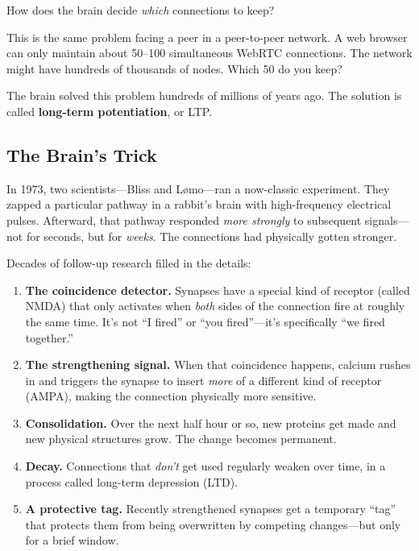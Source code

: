 \documentclass[nobib]{tufte-handout}
\begin{document}
How does the brain decide \emph{which} connections to keep?

This is the same problem facing a peer in a peer-to-peer network. A web browser can only maintain about 50--100 simultaneous WebRTC connections. The network might have hundreds of thousands of nodes. Which 50 do you keep?

The brain solved this problem hundreds of millions of years ago. The solution is called \textbf{long-term potentiation}, or LTP.

\subsection{The Brain's Trick}

In 1973, two scientists---Bliss and L\o mo---ran a now-classic experiment. They zapped a particular pathway in a rabbit's brain with high-frequency electrical pulses. Afterward, that pathway responded \emph{more strongly} to subsequent signals---not for seconds, but for \emph{weeks}. The connections had physically gotten stronger.

Decades of follow-up research filled in the details:

\begin{enumerate}
  \item \textbf{The coincidence detector.} Synapses have a special kind of receptor (called NMDA) that only activates when \emph{both} sides of the connection fire at roughly the same time. It's not ``I fired'' or ``you fired''---it's specifically ``we fired together.''
  \item \textbf{The strengthening signal.} When that coincidence happens, calcium rushes in and triggers the synapse to insert \emph{more} of a different kind of receptor (AMPA), making the connection physically more sensitive.
  \item \textbf{Consolidation.} Over the next half hour or so, new proteins get made and new physical structures grow. The change becomes permanent.
  \item \textbf{Decay.} Connections that \emph{don't} get used regularly weaken over time, in a process called long-term depression (LTD).
  \item \textbf{A protective tag.} Recently strengthened synapses get a temporary ``tag'' that protects them from being overwritten by competing changes---but only for a brief window.
\end{enumerate}
\end{document}
